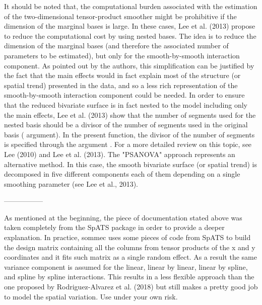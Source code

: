 \documentclass[a4paper]{book}
\begin{document}
\begin{Details}
It should be noted that, the computational burden associated with the estimation of the two-dimensional tensor-product smoother might be prohibitive if the dimension of the marginal bases is large. In these cases, Lee et al. (2013) propose to reduce the computational cost by using nested bases. The idea is to reduce the dimension of the marginal bases (and therefore the associated number of parameters to be estimated), but only for the smooth-by-smooth interaction component. As pointed out by the authors, this simplification can be justified by the fact that the main effects would in fact explain most of the structure (or spatial trend) presented in the data, and so a less rich representation of the smooth-by-smooth interaction component could be needed. In order to ensure that the reduced bivariate surface is in fact nested to the model including only the main effects, Lee et al. (2013) show that the number of segments used for the nested basis should be a divisor of the number of segments used in the original basis ( argument). In the present function, the divisor of the number of segments is specified through the argument . For a more detailed review on this topic, see Lee (2010) and Lee et al. (2013). The "PSANOVA" approach represents an alternative method. In this case, the smooth bivariate surface (or spatial trend) is decomposed in five different components each of them depending on a single smoothing parameter (see Lee et al., 2013).

-----------------

As mentioned at the beginning, the piece of documentation stated above was taken completely from the SpATS package in order to provide a deeper explanation. In practice, sommec uses some pieces of code from SpATS to build the design matrix containing all the columns from tensor products of the x and y coordinates and it fits such matrix as a single random effect. As a result the same variance component is assumed for the linear, linear by linear, linear by spline, and spline by spline interactions. This results in a less flexible approach than the one proposed by Rodriguez-Alvarez et al. (2018) but still makes a pretty good job to model the spatial variation. Use under your own risk.

\end{Details}
%
\end{document}
